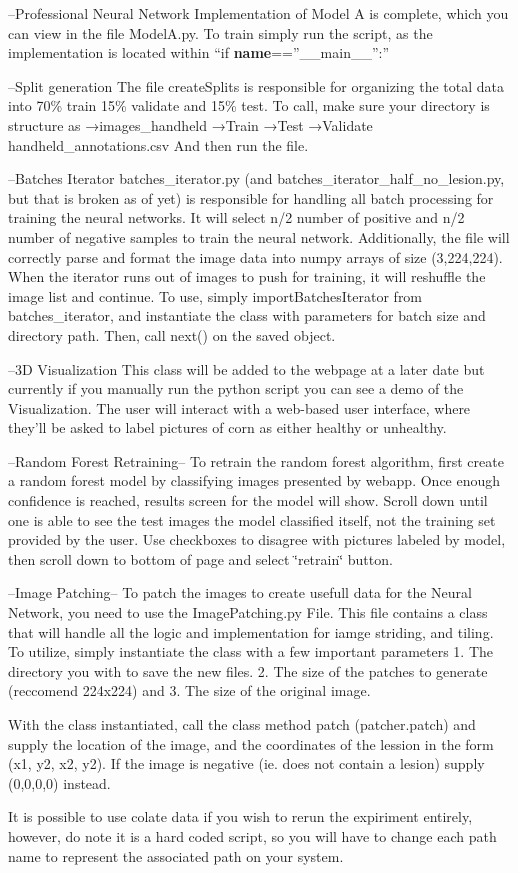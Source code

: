 –\+Professional Neural Network Implementation of Model A is complete, which you can view in the file Model\+A.\+py. To train simply run the script, as the implementation is located within “if {\bfseries{name}}==”\+\_\+\+\_\+main\+\_\+\+\_\+”\+:”

–\+Split generation The file create\+Splits is responsible for organizing the total data into 70\% train 15\% validate and 15\% test. To call, make sure your directory is structure as →images\+\_\+handheld →\+Train →\+Test →\+Validate handheld\+\_\+annotations.\+csv And then run the file.

–\+Batches Iterator batches\+\_\+iterator.\+py (and batches\+\_\+iterator\+\_\+half\+\_\+no\+\_\+lesion.\+py, but that is broken as of yet) is responsible for handling all batch processing for training the neural networks. It will select n/2 number of positive and n/2 number of negative samples to train the neural network. Additionally, the file will correctly parse and format the image data into numpy arrays of size (3,224,224). When the iterator runs out of images to push for training, it will reshuffle the image list and continue. To use, simply import\+Batches\+Iterator from batches\+\_\+iterator, and instantiate the class with parameters for batch size and directory path. Then, call next() on the saved object. ~\newline


–3D Visualization This class will be added to the webpage at a later date but currently if you manually run the python script you can see a demo of the Visualization. The user will interact with a web-\/based user interface, where they’ll be asked to label pictures of corn as either healthy or unhealthy.

--Random Forest Retraining-- To retrain the random forest algorithm, first create a random forest model by classifying images presented by webapp. Once enough confidence is reached, results screen for the model will show. Scroll down until one is able to see the test images the model classified itself, not the training set provided by the user. Use checkboxes to disagree with pictures labeled by model, then scroll down to bottom of page and select \char`\"{}retrain\char`\"{} button.

--Image Patching-- To patch the images to create usefull data for the Neural Network, you need to use the Image\+Patching.\+py File. This file contains a class that will handle all the logic and implementation for iamge striding, and tiling. To utilize, simply instantiate the class with a few important parameters 1. The directory you with to save the new files. 2. The size of the patches to generate (reccomend 224x224) and 3. The size of the original image.

With the class instantiated, call the class method patch (patcher.\+patch) and supply the location of the image, and the coordinates of the lession in the form (x1, y2, x2, y2). If the image is negative (ie. does not contain a lesion) supply (0,0,0,0) instead.

It is possible to use colate data if you wish to rerun the expiriment entirely, however, do note it is a hard coded script, so you will have to change each path name to represent the associated path on your system. 